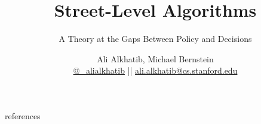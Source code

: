 \documentclass[aspectratio=169,12pt]{beamer} %
\title{Street-Level Algorithms}
\subtitle{A Theory at the Gaps Between Policy and Decisions}
\author{{Ali Alkhatib}, Michael Bernstein\\
\href{http://twitter.com/_alialkhatib}{@\_alialkhatib} || \href{mailto:ali.alkhatib@cs.stanford.edu}{ali.alkhatib@cs.stanford.edu}}
\institute[Stanford]{{\normalsize Stanford HCI Group}}
\date{}
\newcommand{\onlyinsubfile}[1]{#1}
\newcommand{\notinsubfile}[1]{}
\begin{document}
\renewcommand{\onlyinsubfile}[1]{}
\renewcommand{\notinsubfile}[1]{#1}

\begin{frame}
\titlepage
\end{frame} 


\def\stackalignment{l}
\def\stacktype{S}









% 






\begin{frame}[allowframebreaks]{references}
  \printbibliography{}
\end{frame}
\end{document}
